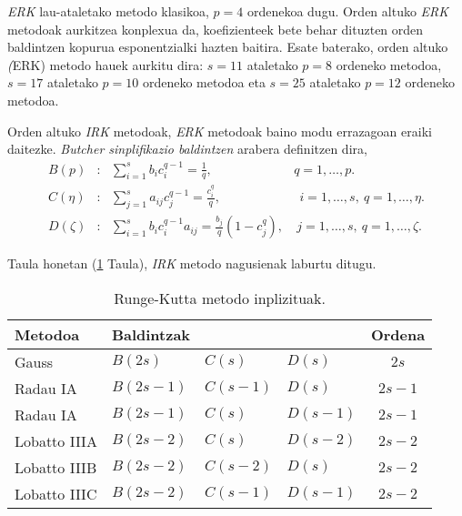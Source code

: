 \emph{ERK} lau-ataletako  metodo klasikoa, $p=4$ ordenekoa dugu. Orden altuko \emph{ERK} metodoak aurkitzea konplexua da,  koefizienteek bete behar dituzten orden baldintzen kopurua esponentzialki hazten baitira. Esate baterako, orden altuko \emph (ERK) metodo hauek aurkitu dira:  $s=11$ ataletako $p=8$ ordeneko metodoa,  $s=17$ ataletako $p=10$ ordeneko metodoa eta  $s=25$ ataletako $p=12$ ordeneko metodoa.
 
Orden altuko \emph{IRK} metodoak, \emph{ERK} metodoak baino modu errazagoan eraiki daitezke.  \emph{Butcher sinplifikazio baldintzen} \cite{Butcher2008} arabera definitzen dira,
\begin{align*}
B(p) &: \ \ \ \sum\limits_{i=1}^{s} b_ic_i^{q-1} =\frac{1}{q}, \ \ & q=1,\dots,p. \\
C(\eta) &: \ \ \ \sum\limits_{j=1}^{s} a_{ij}c_j^{q-1}  =\frac{c_i^q}{q},& \ \ i=1,\dots,s, \ q=1,\dots,\eta.\\
D(\zeta) &:  \ \ \ \sum\limits_{i=1}^{s}  b_i c_i^{q-1}  a_{ij} = \frac{b_j}{q} (1-c_j^q),&  \ j=1,\dots,s, \  q=1,\dots,\zeta.
\end{align*}

Taula honetan (\ref{tab:irk} Taula), \emph{IRK} metodo nagusienak laburtu ditugu.
\begin{table}
\centering
\caption{Runge-Kutta metodo inplizituak.}
\label{tab:irk}       %
\begin{tabular}{ l l l l c } 
 \hline
 Metodoa          &  Baldintzak             &                        &                 & Ordena \\
 \hline
 Gauss            &  $B(2s)$                & $C(s)$                 & $D(s)$          & $2s$    \\
 \hline
 Radau IA         &  $B(2s-1)$              & $C(s-1)$               & $D(s)$          & $2s-1$  \\
 \hline 
 Radau IA         &  $B(2s-1)$              & $C(s)$                 & $D(s-1)$        & $2s-1$  \\
 \hline 
 Lobatto IIIA     &  $B(2s-2)$              & $C(s)$                 & $D(s-2)$        & $2s-2$  \\
 \hline
 Lobatto IIIB     &  $B(2s-2)$              & $C(s-2)$               & $D(s)$          & $2s-2$  \\
 \hline 
 Lobatto IIIC     &  $B(2s-2)$              & $C(s-1)$               & $D(s-1)$        & $2s-2$  \\
  \hline
 \end{tabular}
\end{table}

